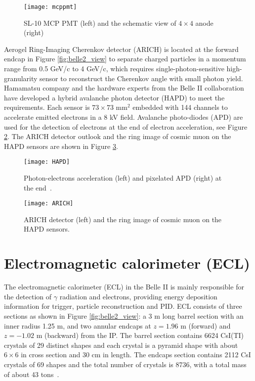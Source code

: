 \begin{figure}[htpb]
	\centering
	\texttt{[image: mcppmt]}
	\caption{SL-10 MCP PMT (left) and the schematic view of $4\times 4$ anode (right)~\cite{Abe:2010gxa}}
	\label{fig:mcppmt}
\end{figure}

Aerogel Ring-Imaging Cherenkov
detector (ARICH) is located at the forward endcap in Figure \ref{fig:belle2_view} to separate charged particles in a momentum range from 0.5 GeV/c to 4 GeV/c, which requires single-photon-sensitive high-granularity sensor to reconstruct the Cherenkov angle with small photon yield.  
Hamamatsu company and the hardware experts from the Belle II collaboration have developed a hybrid avalanche photon detector (HAPD) to meet the requirements. Each sensor is $73 \times 73$ mm$^2$ embedded with 144 channels to accelerate emitted electrons in a 8 kV field. Avalanche photo-diodes (APD) are used for the detection of electrons at the end of electron acceleration, see Figure \ref{fig:arich_img}. The ARICH detector outlook and the ring image of cosmic muon on the HAPD sensors are shown in Figure \ref{fig:HAPD}.

\begin{figure}[htpb]
	\centering
	\texttt{[image: HAPD]}
	\caption{Photon-electrons acceleration (left) and pixelated APD (right) at the end~\cite{Abe:2010gxa}.}
	\label{fig:arich_img}
\end{figure}



\begin{figure}[htpb]
	\centering
	\texttt{[image: ARICH]}
	\caption{ARICH detector (left) and the ring image of cosmic muon on the HAPD sensors\cite{b2book}.}
	\label{fig:HAPD}
\end{figure}

\section{Electromagnetic calorimeter (ECL)}
The electromagnetic calorimeter (ECL) in the Belle II is mainly responsible for the detection of $\gamma$ radiation and electrons, providing energy deposition information for trigger, particle reconstruction and PID. ECL consists of three sections as shown in Figure \ref{fig:belle2_view}: a 3 m long barrel section with an inner radius 1.25 m, and two annular endcaps at $z = 1.96$ m (forward) and $z = -1.02$ m (backward) from the IP. The barrel section contains 6624 CsI(TI) crystals of 29 distinct shapes and each crystal is a pyramid shape with about $6\times 6$ in cross section and 30 cm in length. The endcaps section contains 2112 CsI crystals of 69 shapes and the total number of crystals is 8736, with a total
mass of about 43 tons~\cite{Abe:2010gxa}.

